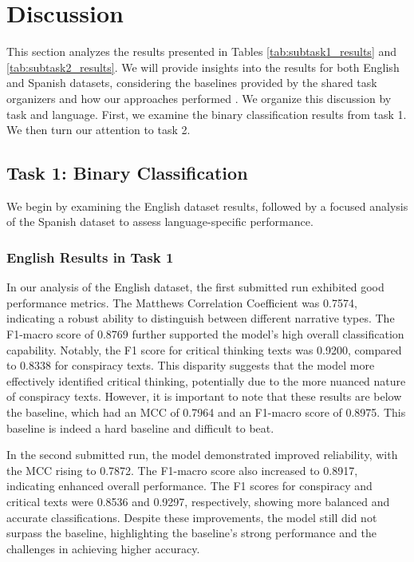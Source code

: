 \documentclass{Configuration_Files/PoliMi3i_thesis}
\begin{document}
\section{Discussion} \label{sec:discussion}
This section analyzes the results presented in Tables \ref{tab:subtask1_results} and \ref{tab:subtask2_results}. We will provide insights into the results for both English and Spanish datasets, considering the baselines provided by the shared task organizers and how our approaches performed \cite{tulbure2024conspiracy}. We organize this discussion by task and language. First, we examine the binary classification results from task 1. We then turn our attention to task 2.

\subsection{Task 1: Binary Classification} \label{subsec:subtask1_discussion}
We begin by examining the English dataset results, followed by a focused analysis of the Spanish dataset to assess language-specific performance.
\subsubsection{English Results in Task 1} \label{subsubsec:en_res_T1}
In our analysis of the English dataset, the first submitted run exhibited good performance metrics. The Matthews Correlation Coefficient was 0.7574, indicating a robust ability to distinguish between different narrative types. The F1-macro score of 0.8769 further supported the model's high overall classification capability. Notably, the F1 score for critical thinking texts was 0.9200, compared to 0.8338 for conspiracy texts. This disparity suggests that the model more effectively identified critical thinking, potentially due to the more nuanced nature of conspiracy texts. However, it is important to note that these results are below the baseline, which had an MCC of 0.7964 and an F1-macro score of 0.8975. This baseline is indeed a hard baseline and difficult to beat.

In the second submitted run, the model demonstrated improved reliability, with the MCC rising to 0.7872. The F1-macro score also increased to 0.8917, indicating enhanced overall performance. The F1 scores for conspiracy and critical texts were 0.8536 and 0.9297, respectively, showing more balanced and accurate classifications. Despite these improvements, the model still did not surpass the baseline, highlighting the baseline's strong performance and the challenges in achieving higher accuracy.
\end{document}
